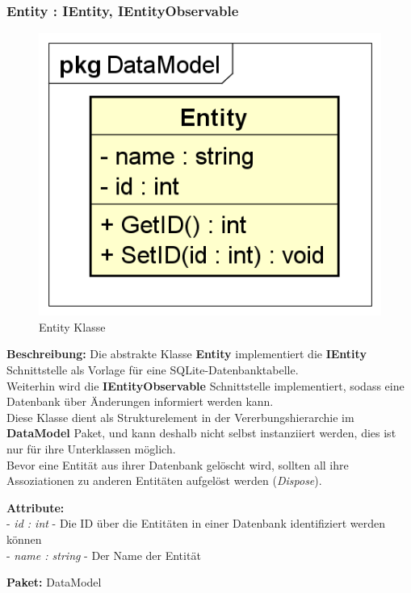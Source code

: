 \documentclass[a4paper]{scrreprt}
\begin{document}
\subsubsection{Entity : IEntity, IEntityObservable}
\begin{figure}[H]
\centering
\includegraphics[width=0.75\textheight]{graphics/Klassendiagramme/Model/Entity.png}
\caption{Entity Klasse}
\end{figure}
\textbf{Beschreibung:} Die abstrakte Klasse \textbf{Entity} implementiert die \textbf{IEntity} Schnittstelle als Vorlage für eine SQLite-Datenbanktabelle.\\
Weiterhin wird die \textbf{IEntityObservable} Schnittstelle implementiert, sodass eine Datenbank über Änderungen informiert werden kann.\\
Diese Klasse dient als Strukturelement in der Vererbungshierarchie im \textbf{DataModel} Paket, und kann deshalb nicht selbst instanziiert werden, dies ist nur für ihre Unterklassen möglich.\\
Bevor eine Entität aus ihrer Datenbank gelöscht wird, sollten all ihre Assoziationen zu anderen Entitäten aufgelöst werden (\textit{Dispose}).

\textbf{Attribute:}\\
- \textit{id : int} - Die ID über die Entitäten in einer Datenbank identifiziert werden können\\
- \textit{name : string} - Der Name der Entität

\textbf{Paket:} DataModel
\end{document}
